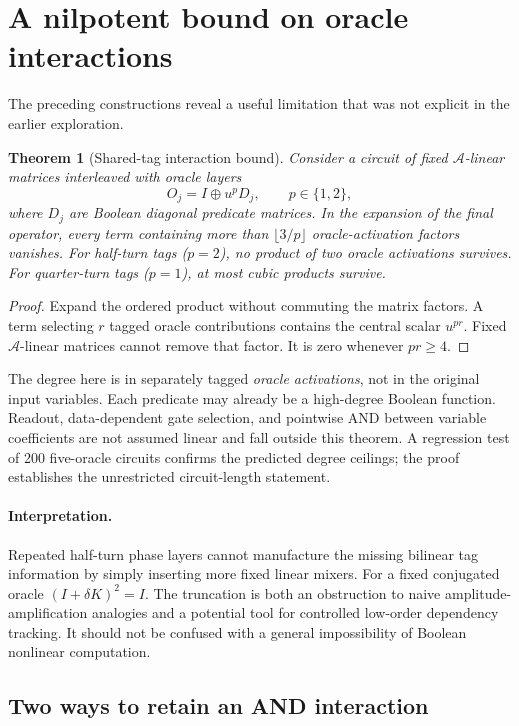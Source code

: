 \documentclass[11pt,a4paper]{article}
\newtheorem{theorem}{Theorem}[section]
\theoremstyle{definition}\newtheorem{definition}[theorem]{Definition}
\theoremstyle{remark}\newtheorem{remark}[theorem]{Remark}
\newcommand{\alg}{\mathcal A}
\numberwithin{equation}{section}
\begin{document}
\section{A nilpotent bound on oracle interactions}\label{sec:nilbound}
The preceding constructions reveal a useful limitation that was not explicit in the earlier exploration.

\begin{theorem}[Shared-tag interaction bound]\label{thm:interaction}
Consider a circuit of fixed $\alg$-linear matrices interleaved with oracle layers
\begin{equation}
 O_j=I\oplus u^pD_j,\qquad p\in\{1,2\},
\end{equation}
where $D_j$ are Boolean diagonal predicate matrices. In the expansion of the final operator, every term containing more than $\lfloor3/p\rfloor$ oracle-activation factors vanishes. For half-turn tags ($p=2$), no product of two oracle activations survives. For quarter-turn tags ($p=1$), at most cubic products survive.
\end{theorem}
\begin{proof}
Expand the ordered product without commuting the matrix factors. A term selecting $r$ tagged oracle contributions contains the central scalar $u^{pr}$. Fixed $\alg$-linear matrices cannot remove that factor. It is zero whenever $pr\ge4$.
\end{proof}
The degree here is in separately tagged \emph{oracle activations}, not in the original input variables. Each predicate may already be a high-degree Boolean function. Readout, data-dependent gate selection, and pointwise AND between variable coefficients are not assumed linear and fall outside this theorem. A regression test of 200 five-oracle circuits confirms the predicted degree ceilings; the proof establishes the unrestricted circuit-length statement.

\paragraph{Interpretation.}
Repeated half-turn phase layers cannot manufacture the missing bilinear tag information by simply inserting more fixed linear mixers. For a fixed conjugated oracle $(I+\delta K)^2=I$. The truncation is both an obstruction to naive amplitude-amplification analogies and a potential tool for controlled low-order dependency tracking. It should not be confused with a general impossibility of Boolean nonlinear computation.

\subsection{Two ways to retain an AND interaction}
\end{document}
